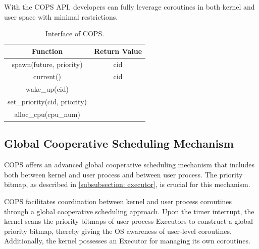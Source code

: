 \documentclass[conference]{IEEEtran}
\begin{document}
With the COPS API, developers can fully leverage coroutines in both kernel and user space with minimal restrictions.

\begin{table}[htbp]
  \centering
  \begin{tabular}{@{}cc@{}}
  \toprule
  Function                     & Return Value \\ \midrule
  spawn(future, priority)      & cid          \\
  current()                    & cid          \\
  wake\_up(cid)                &              \\
  set\_priority(cid, priority) &              \\
  alloc\_cpu(cpu\_num)          &              \\ \bottomrule
  \end{tabular}
  \caption{Interface of COPS.}
  \label{tab:interface}
  \vspace{-1em}
\end{table}

\subsection{Global Cooperative Scheduling Mechanism}
\label{section: global-cooperative-scheduling}

COPS offers an advanced global cooperative scheduling mechanism that includes both between kernel and user process and between user process. The priority bitmap, as described in \ref{subsubsection: executor}, is crucial for this mechanism.

COPS facilitates coordination between kernel and user process coroutines through a global cooperative scheduling approach. Upon the timer interrupt, the kernel scans the priority bitmaps of user process Executors to construct a global priority bitmap, thereby giving the OS awareness of user-level coroutines. Additionally, the kernel possesses an Executor for managing its own coroutines.
\end{document}
